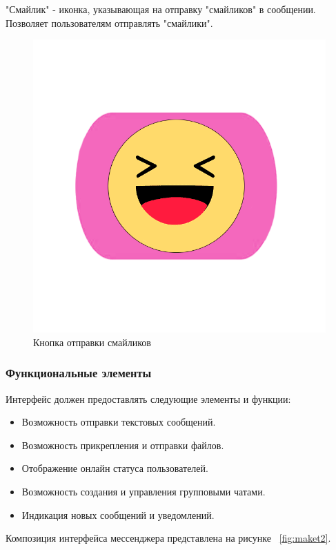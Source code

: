 \begin{enumerate}
"Смайлик"  - иконка, указывающая на отправку "смайликов" в сообщении. Позволяет пользователям отправлять "смайлики".
\begin{figure}[H]
	\centering
	\includegraphics[width=0.7\linewidth]{images/smile}
	\caption{Кнопка отправки смайликов}
	\label{fig:smile}
\end{figure}

\subsubsection{Функциональные элементы}
Интерфейс должен предоставлять следующие элементы и функции:
\begin{itemize}
	\item Возможность отправки текстовых сообщений.
	\item Возможность прикрепления и отправки файлов.
	\item Отображение онлайн статуса пользователей.
	\item Возможность создания и управления групповыми чатами.
	\item Индикация новых сообщений и уведомлений.
\end{itemize}

Композиция интерфейса мессенджера представлена на рисунке ~\ref{fig:maket2}.


\end{enumerate}
